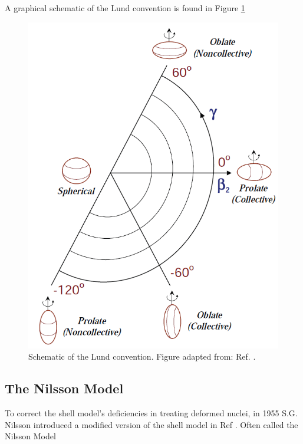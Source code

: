 A graphical schematic of the Lund convention is found in Figure \ref{fig:chp2-lund}
\begin{figure}
\label{fig:chp2-lund}
\centerline{\includegraphics[height=0.25\textheight]{./img/c2/lundconv.png}}
	\caption{Schematic of the Lund convention. Figure adapted from: Ref. \cite{danielDissertation}.}
\end{figure}
\subsection{The Nilsson Model}
To correct the shell model's deficiencies in treating deformed nuclei, in 1955 S.G. Nilsson introduced a modified version of the shell model in Ref \cite{nilsson}. Often called the Nilsson Model

